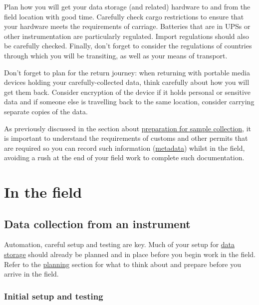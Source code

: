 \documentclass[a4paper,oneside]{report}
\begin{document}
Plan how you will get your data storage (and related) hardware to and
from the field location with good time. Carefully check cargo
restrictions to ensure that your hardware meets the requirements of
carriage. Batteries that are in UPSs or other instrumentation are
particularly regulated. Import regulations should also be carefully
checked. Finally, don't forget to consider the regulations of countries
through which you will be transiting, as well as your means of
transport.

Don't forget to plan for the return journey: when returning with
portable media devices holding your carefully-collected data, think
carefully about how you will get them back. Consider encryption of the
device if it holds personal or sensitive data and if someone else is
travelling back to the same location, consider carrying separate copies
of the data.

As previously discussed in the section about
\protect\hyperlink{preparing-for-sample-collection}{preparation for
sample collection}, it is important to understand the requirements of
customs and other permits that are required so you can record such
information (\protect\hyperlink{metadata}{metadata}) whilst in the
field, avoiding a rush at the end of your field work to complete such
documentation.

\hypertarget{in-the-field}{%
\chapter{In the field}\label{in-the-field}}

\hypertarget{data-collection-from-an-instrument}{%
\section{Data collection from an
instrument}\label{data-collection-from-an-instrument}}

Automation, careful setup and testing are key. Much of your setup for
\protect\hyperlink{storing-data}{data storage} should already be planned
and in place before you begin work in the field. Refer to the
\protect\hyperlink{before-you-go}{planning} section for what to think
about and prepare before you arrive in the field.

\hypertarget{initial-setup-and-testing}{%
\subsection{Initial setup and testing}\label{initial-setup-and-testing}}
\end{document}
